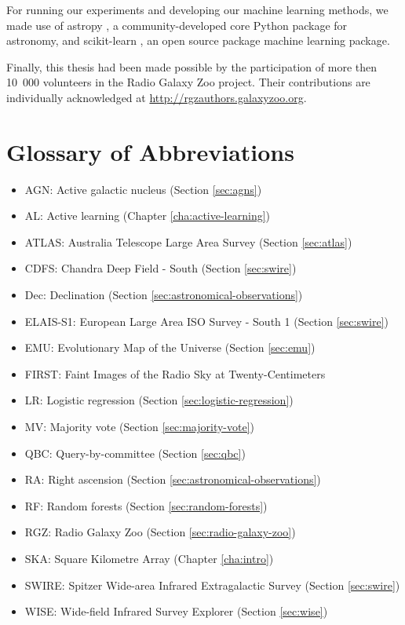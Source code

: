   For running our experiments and developing our machine learning methods, we
  made use of astropy \citep{astropy}, a community-developed core Python package
  for astronomy, and scikit-learn \citep{scikit-learn}, an open source package
  machine learning package.

  Finally, this thesis had been made possible by the participation of more then
  10~000 volunteers in the Radio Galaxy Zoo project. Their contributions are
  individually acknowledged at \url{http://rgzauthors.galaxyzoo.org}.

\section{Glossary of Abbreviations}

  \begin{itemize}
    \item AGN: Active galactic nucleus (Section \ref{sec:agns})
    \item AL: Active learning (Chapter \ref{cha:active-learning})
    \item ATLAS: Australia Telescope Large Area Survey (Section \ref{sec:atlas})
    \item CDFS: Chandra Deep Field - South (Section \ref{sec:swire})
    \item Dec: Declination (Section \ref{sec:astronomical-observations})
    \item ELAIS-S1: European Large Area ISO Survey - South 1 (Section \ref{sec:swire})
    \item EMU: Evolutionary Map of the Universe (Section \ref{sec:emu})
    \item FIRST: Faint Images of the Radio Sky at Twenty-Centimeters
    \item LR: Logistic regression (Section \ref{sec:logistic-regression})
    \item MV: Majority vote (Section \ref{sec:majority-vote})
    \item QBC: Query-by-committee (Section \ref{sec:qbc})
    \item RA: Right ascension (Section \ref{sec:astronomical-observations})
    \item RF: Random forests (Section \ref{sec:random-forests})
    \item RGZ: Radio Galaxy Zoo (Section \ref{sec:radio-galaxy-zoo})
    \item SKA: Square Kilometre Array (Chapter \ref{cha:intro})
    \item SWIRE: Spitzer Wide-area Infrared Extragalactic Survey (Section \ref{sec:swire})
    \item WISE: Wide-field Infrared Survey Explorer (Section \ref{sec:wise})
  \end{itemize}
